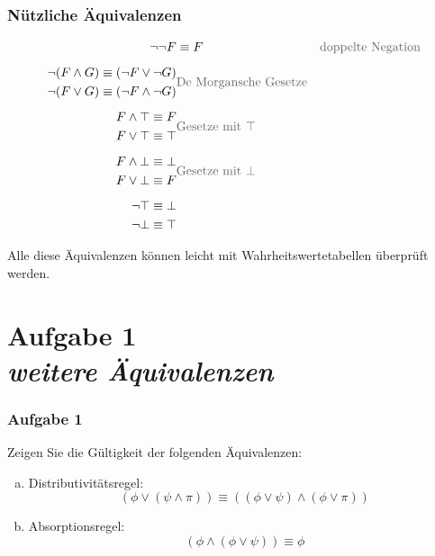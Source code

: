 \documentclass{beamer}
\begin{document}
	\begin{frame}\frametitle{Nützliche Äquivalenzen}
		\small
		\begin{align*}
			\neg\neg F &\equiv F
			& \text{\textcolor{devilscss}{doppelte Negation}}\\[1ex]
			\begin{split}
				\neg(F\wedge G) & \equiv (\neg F\vee \neg G)\\
				\neg(F\vee G) & \equiv (\neg F\wedge \neg G)
			\end{split}
			& \text{\textcolor{devilscss}{De Morgansche Gesetze}} \\[1ex]
			\begin{split}
				F\wedge \top & \equiv F\\
				F\vee \top & \equiv \top
			\end{split}
			& \text{\textcolor{devilscss}{Gesetze mit $\top$}}\\[1ex]
			\begin{split}
				F\wedge \bot & \equiv \bot\\
				F\vee \bot & \equiv F
			\end{split}
			& \text{\textcolor{devilscss}{Gesetze mit $\bot$}}\\[1ex]
			\begin{split}
				\neg\top & \equiv \bot\\
				\neg\bot & \equiv \top
			\end{split}
			& 
		\end{align*}
		
		Alle diese Äquivalenzen können leicht mit Wahrheitswertetabellen überprüft werden.
	\end{frame}


	\section{Aufgabe 1 \\ \itshape weitere Äquivalenzen}
	
	\begin{frame} \frametitle{Aufgabe 1}
		\small
		Zeigen Sie die Gültigkeit der folgenden Äquivalenzen:
		\begin{enumerate}[a)]
			\item Distributivitätsregel:
			\begin{equation*}
				(\phi \lor (\psi \land \pi)) \equiv ((\phi \lor \psi) \land (\phi \lor \pi))
			\end{equation*}
			\item Absorptionsregel:
			\begin{equation*}
				(\phi \land (\phi \lor \psi)) \equiv \phi
			\end{equation*}
		\end{enumerate}
	\end{frame}
\end{document}
